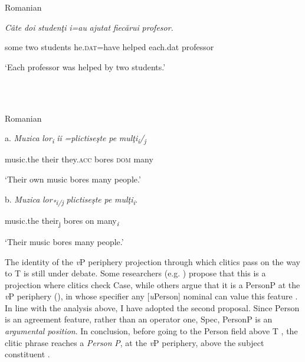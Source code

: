 \documentclass[output=paper,colorlinks,citecolor=brown]{./langscibook}
\begin{document}
\ea%
    \label{ex:key:27}
    \gll\\
        \\
    \glt
    \z

           Romanian

\textit{Câte} \textit{doi} \textit{studenţi}  \textit{i=au}     \textit{ajutat}  \textit{fiecărui} \textit{profesor.}

  some two students   he.\textsc{dat}=have   helped   each.dat professor

  ‘Each professor was helped by two students.’

\ea%
    \label{ex:key:28}
    \gll\\
        \\
    \glt
    \z

          Romanian

a.   \textit{Muzica} \textit{lor\textsubscript{i}}  \textit{îi} \textit{=plictiseşte}    \textit{pe} \textit{mulţi\textsubscript{i}}\textit{/\textsubscript{j}}

    music.the their  they.\textsc{acc} bores    \textsc{dom} many

    ‘Their own music bores many people.’

  b.   \textit{Muzica} \textit{lor\textsubscript{*i/j}}    \textit{plictiseşte}  \textit{pe}  \textit{mulţi\textsubscript{i}}.

    music.the their\textsubscript{j} bores    on  many\textit{\textsubscript{i}}

    ‘Their music bores many people.’

The identity of the \textit{v}P periphery projection through which clitics pass on the way to T is still under debate. Some researchers (e.g. \citealt{Ciucivara2009}) propose that this is a projection where clitics check Case, while others argue that it is a PersonP at the \textit{v}P periphery (\citealt{Belletti2004Probus, Stegovec2015}), in whose specifier any [\textit{u}Person] nominal can value this feature . In line with the analysis above, I have adopted the second proposal. Since Person is an agreement feature, rather than an operator one, Spec, PersonP is an \textit{argumental} \textit{position}. In conclusion, before going to the Person field above T \citep{Ciucivara2009}, the clitic phrase reaches a \textit{Person} \textit{P}, at the \textit{v}P periphery, above the subject constituent .

\ea%
    \label{ex:key:29}
    \gll\\
        \\
    \glt
    \z
\end{document}
